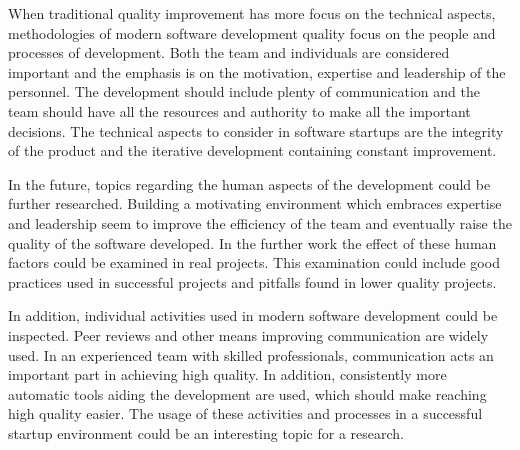 When traditional quality improvement has more focus on the technical aspects, methodologies of modern software development quality focus on the people and processes of development. Both the team and individuals are considered important and the emphasis is on the motivation, expertise and leadership of the personnel. The development should include plenty of communication and the team should have all the resources and authority to make all the important decisions. The technical aspects to consider in software startups are the integrity of the product and the iterative development containing constant improvement.


In the future, topics regarding the human aspects of the development could be further researched. Building a motivating environment which embraces expertise and leadership seem to improve the efficiency of the team and eventually raise the quality of the software developed. In the further work the effect of these human factors could be examined in real projects. This examination could include good practices used in successful projects and pitfalls found in lower quality projects.

In addition, individual activities used in modern software development could be inspected. Peer reviews and other means improving communication are widely used. In an experienced team with skilled professionals, communication acts an important part in achieving high quality. In addition, consistently more automatic tools aiding the development are used, which should make reaching high quality easier. The usage of these activities and processes in a successful startup environment could be an interesting topic for a research.
